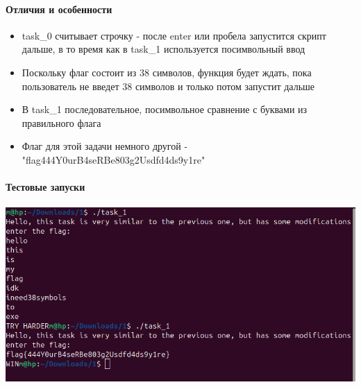 \documentclass{article}
\begin{document}
\paragraph{Отличия и особенности}
\begin{itemize}
    \item task\_0 считывает строчку - после enter или пробела запустится скрипт дальше, в то время как в task\_1 используется посимвольный ввод

    \item Поскольку флаг состоит из 38 символов, функция будет ждать, пока пользователь не введет 38 символов и только потом запустит дальше

    \item В task\_1 последовательное, посимвольное сравнение с буквами из правильного флага

    \item Флаг для этой задачи немного другой - "flag{444Y0urB4seRBe803g2Usdfd4ds9y1re}"
\end{itemize}

\paragraph{Тестовые запуски}
\paragraph{}

\includegraphics[width=0.75\linewidth]{static/solution_task_1.png}
\end{document}
